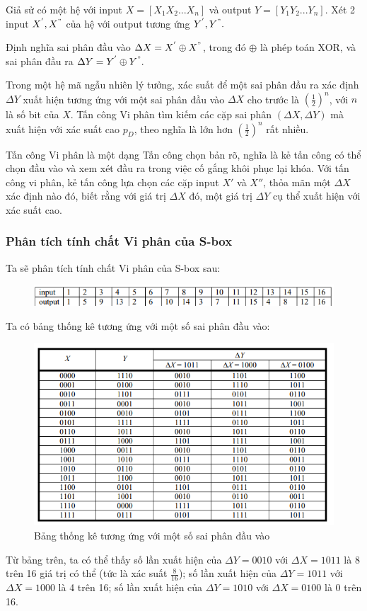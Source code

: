 Giả sử có một hệ với input $X = [ X_1 X_2 ... X_n ]$ và output $Y = [Y_1 Y_2 ... Y_n].$ Xét 2 input $X^{'}, X^{"}$ của hệ với output tương ứng $Y^{'}, Y^{"}.$ 

Định nghĩa sai phân đầu vào $\Delta X = X^{'} \oplus X^{"}$, trong đó $\oplus$ là phép toán XOR, và sai phân đầu ra $\Delta Y = Y^{'} \oplus Y^{"}.$

Trong một hệ mã ngẫu nhiên lý tưởng, xác suất để một sai phân đầu ra xác định $\Delta Y$ xuất hiện tương ứng với một sai phân đầu vào $\Delta X$ cho trước là $(\frac{1}{2})^n$, với $n$ là số bit của $X$. Tấn công Vi phân tìm kiếm các cặp sai phân $(\Delta X, \Delta Y)$ mà xuất hiện với xác suất cao $p_D$, theo nghĩa là lớn hơn $(\frac{1}{2})^n$ rất nhiều.

Tấn công Vi phân là một dạng Tấn công chọn bản rõ, nghĩa là kẻ tấn công có thể chọn đầu vào và xem xét đầu ra trong việc cố gắng khôi phục lại khóa. Với tấn công vi phân, kẻ tấn công lựa chọn các cặp input $X'$ và $X''$, thỏa mãn một $\Delta X$ xác định nào đó, biết rằng với giá trị $\Delta X$ đó, một giá trị $\Delta Y$ cụ thể xuất hiện với xác suất cao.
\subsubsection{Phân tích tính chất Vi phân của S-box}
Ta sẽ phân tích tính chất Vi phân của S-box sau:
\begin{figure}[H]
    \centering
    \includegraphics[scale=1]{Các công cụ và kĩ thuật sử dụng trong tấn công/S-boz.png}
    
\end{figure} 
Ta có bảng thống kê tương ứng với một số sai phân đầu vào:
\begin{figure}[H]
    \centering
    \includegraphics[scale=0.9]{Các công cụ và kĩ thuật sử dụng trong tấn công/sample diff sbox.png}
    
    \caption{Bảng thống kê tương ứng với một số sai phân đầu vào}
\end{figure}
Từ bảng trên, ta có thể thấy số lần xuất hiện của $\Delta Y = 0010$ với $\Delta X = 1011$ là 8 trên 16 giá trị có thể (tức là xác suất $\frac{8}{16}$); số lần xuất hiện của $\Delta Y = 1011$ với $\Delta X = 1000$ là 4 trên 16; số lần xuất hiện của $\Delta Y = 1010$ với $\Delta X =0100$ là 0 trên 16. 

